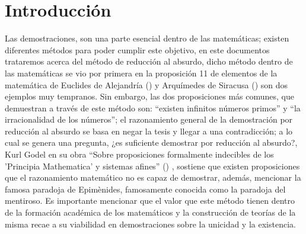 \section{Introducción}
 Las demostraciones, son una parte esencial dentro de las matemáticas; existen diferentes métodos para poder cumplir este objetivo, en este documentos trataremos 
    acerca del método de reducción al absurdo, dicho método dentro de las matemáticas se vio por primera en la proposición 11 de elementos de la matemática de Euclides 
    de Alejandría (\cite{euclidesSeisLibrosPrimeros1576}) y Arquímedes de Siracusa (\cite{parra}) son dos ejemplos muy tempranos. Sin embargo, las dos proposiciones más comunes, 
    que demuestran a través de este método son: “existen infinitos números primos” y “la irracionalidad de los números”; el razonamiento general de la demostración por reducción 
    al absurdo se basa en negar la tesis y llegar a una contradicción; a lo cual se genera una pregunta, ¿es suficiente demostrar por reducción al absurdo?, Kurl Godel en su obra 
    “Sobre proposiciones formalmente indecibles de los 'Principia Mathematica' y sistemas afines” (\cite{bauer}) , sostiene que existen proposiciones que el 
    razonamiento matemático no es capaz de demostrar, además, mencionar la famosa paradoja de Epimènides, famosamente conocida como la paradoja del mentiroso. Es importante 
    mencionar que el valor que este método tienen dentro de la formación académica de los matemáticos y la construcción de teorías de la misma recae a su viabilidad en 
    demostraciones sobre la unicidad y la existencia.